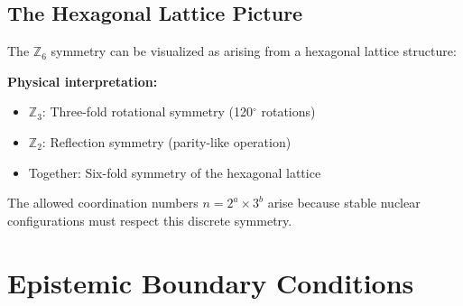 \documentclass[11pt,a4paper]{article}
\begin{document}
\subsection{The Hexagonal Lattice Picture}

The $\mathbb{Z}_6$ symmetry can be visualized as arising from a hexagonal lattice structure:

\begin{center}
\end{center}

\textbf{Physical interpretation:}
\begin{itemize}
    \item $\mathbb{Z}_3$: Three-fold rotational symmetry (120$^\circ$ rotations)
    \item $\mathbb{Z}_2$: Reflection symmetry (parity-like operation)
    \item Together: Six-fold symmetry of the hexagonal lattice
\end{itemize}

The allowed coordination numbers $n = 2^a \times 3^b$ arise because stable nuclear configurations must respect this discrete symmetry.

\section{Epistemic Boundary Conditions}
\label{sec:epistemic_boundary}
\end{document}
